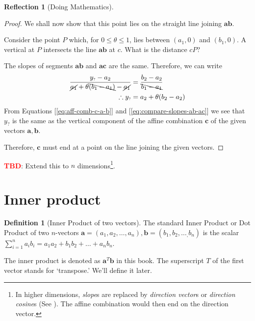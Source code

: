 \documentclass[11pt]{book}
\theoremstyle{definition}
\newtheorem{definition}{Definition}
\theoremstyle{plain}
\theoremstyle{problemstyle}
\theoremstyle{remark}
\theoremstyle{definition}
\newtheorem{reflection}{Reflection}
\begin{document}
\begin{reflection}[Doing Mathematics]
\begin{proof}
        We shall now show that this point lies on the straight line joining $\boldsymbol{ab}$.

        Consider the point $P$ which, for $0\leq\theta\leq 1$, lies between $(a_1,0)$ and $(b_1,0)$. A vertical at $P$ intersects the line $\boldsymbol{ab}$ at $c$. What is the distance $cP$? 

        The slopes of segments $\boldsymbol{ab}$ and $\boldsymbol{ac}$ are the same. Therefore, we can write
            \begin{equation}
                \label{eq:compare-slopes-ab-ac}
            \begin{aligned}
                \frac{y_{\scriptscriptstyle ?}-a_2}{\cancel{a_1}+\theta\bcancel{(b_1-a_1)}-\cancel{a_1}}&=\frac{b_2-a_2}{\bcancel{b_1-a_1}}\\
                \therefore y_{\scriptscriptstyle ?}&=a_2+\theta(b_2-a_2)
            \end{aligned}
            \end{equation}
        From Equations [\ref{eq:aff-comb-c-a-b}] and [\ref{eq:compare-slopes-ab-ac}] we see that $y_{\scriptscriptstyle ?}$ is the same as the vertical component of the affine combination $\boldsymbol{c}$ of the given vectors $\boldsymbol{a,b}$.

        Therefore, $\boldsymbol{c}$ must end at a point on the line joining the given vectors.
        \end{proof}
        \textcolor{red}{\textbf{TBD}}: Extend this to $n$ dimensions\footnote{In higher dimensions, \emph{slope}s are replaced by \emph{direction vector}s or \emph{direction cosine}s (See \cite{slope-higher-dimensions}). The affine combination would then end on the direction vector.}.
\end{reflection}

\section{Inner product}
\begin{definition}[Inner Product of two vectors]
    The standard Inner Product or Dot Product of two $n$-vectors $\boldsymbol{a}=(a_1,a_2,\dots,a_n),\boldsymbol{b}=(b_1,b_2,\dots_,b_n)$ is the scalar $\sum_{i=1}^{n}a_ib_i=a_1a_2+b_1b_2+\dots+a_nb_n$.

    The inner product is denoted as $\boldsymbol{a}^T\boldsymbol{b}$ in this book. The superscript $T$ of the first vector stands for `transpose.' We'll define it later.
\end{definition}
\end{document}
